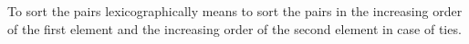 To sort the pairs lexicographically means to sort the pairs in the increasing order of the first element and the increasing order of the second element in case of ties.
